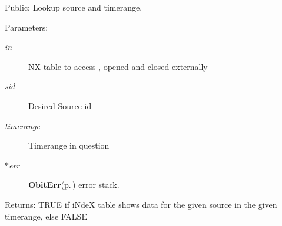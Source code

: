 Public: Lookup source and timerange. 

\begin{Desc}
\item[Parameters:]
\begin{description}
\item[{\em in}]NX table to access , opened and closed externally \item[{\em sid}]Desired Source id \item[{\em timerange}]Timerange in question \item[{\em $\ast$err}]{\bf Obit\-Err}{\rm (p.\,\pageref{structObitErr})} error stack. \end{description}
\end{Desc}
\begin{Desc}
\item[Returns:]TRUE if i\-Nde\-X table shows data for the given source in the given timerange, else FALSE \end{Desc}
